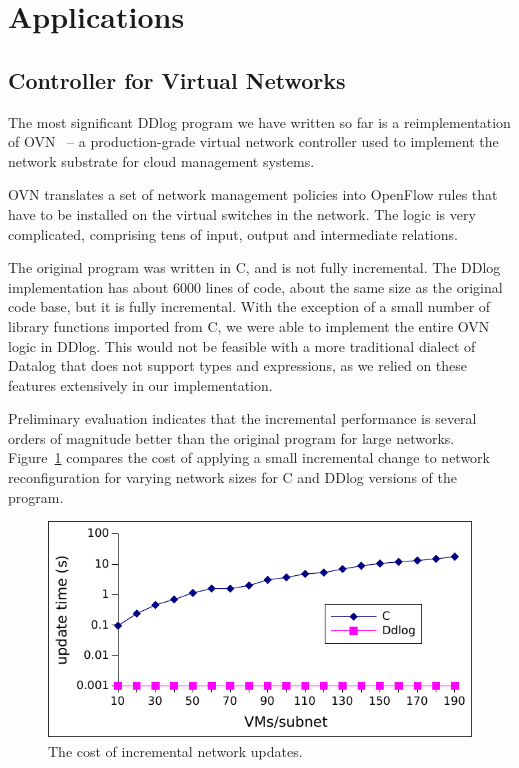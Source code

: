 \section{Applications}\label{sec:applications}

\subsection{Controller for Virtual Networks}

The most significant DDlog program we have written so far is a
reimplementation of OVN~\cite{ovn} -- a production-grade
virtual network controller used to implement the network substrate
for cloud management systems.

OVN translates a set of network management policies into OpenFlow
rules that have to be installed on the virtual switches in the
network.  The logic is very complicated, comprising tens of input,
output and intermediate relations.

The original program was written in C, and is not fully incremental.
The DDlog implementation has about 6000 lines of code, about the same
size as the original code base, but it is fully incremental.
With the exception of a small number of library functions imported
from C, we were able to implement the entire OVN logic in DDlog.
This would not be feasible with a more traditional dialect of Datalog
that does not support types and expressions, as we relied on these
features extensively in our implementation.


Preliminary evaluation indicates that the incremental performance is
several orders of magnitude better than the original program for large
networks.  Figure~\ref{fig:ovn_perf} compares the cost of applying a small incremental
change to network reconfiguration for varying network sizes for
C and DDlog versions of the program.

\begin{figure}
    \center
    \includegraphics[width=0.4\columnwidth]{update_plot.pdf}
    \caption{The cost of incremental network updates.\label{fig:ovn_perf}}
\end{figure}

